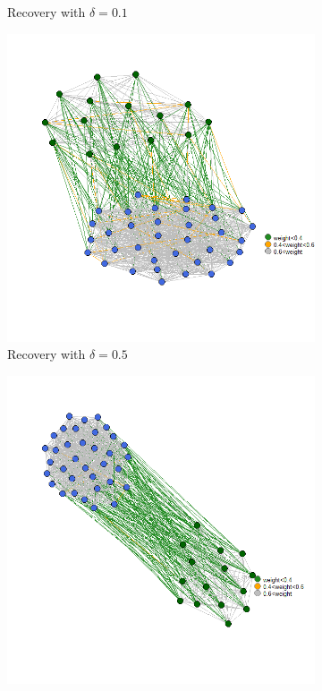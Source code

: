 \documentclass[12pt]{amsart}
\theoremstyle{remark}
\begin{document}
\begin{figure}[h]
\begin{subfigure}[b]{0.37\textwidth}
         \caption{Recovery with $\delta=0.1$}
     \end{subfigure}
     \hfill
     \begin{subfigure}[b]{0.37\textwidth}
         \centering
         \includegraphics[width=\textwidth]{./Pictures/recupera2.png}
         \caption{Recovery with $\delta=0.5$}
     \end{subfigure}
     \hfill
     \begin{subfigure}[b]{0.37\textwidth}
         \centering
         \includegraphics[width=\textwidth]{./Pictures/recupera4.png}

\end{subfigure}
\end{figure}
\end{document}
